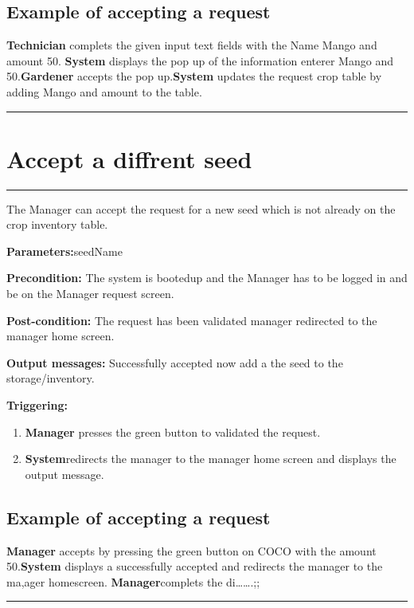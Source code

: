 \subsection{Example of accepting a request}
\textbf{Technician} complets the given input text fields with the Name Mango and
amount 50. \textbf{System} displays the pop up of the information enterer Mango
and 50.\textbf{Gardener} accepts the pop up.\textbf{System} updates the request
crop table by adding Mango and amount to the table.
\hfill
\vspace{0.5cm}
\hrule


\section{Accept a diffrent seed}

\hrule
\hfill
\vspace{0.5cm}

\label{operation:Accept a diffrent seed}

The Manager can accept the request for a new seed which is not already on the
crop inventory table.
\begin{description}
\item \textbf{Parameters:}seedName
\item \textbf{Precondition:} The system is bootedup and the Manager has to be
logged in and be on the Manager request screen.
\item \textbf{Post-condition:} The request has been validated manager
redirected to the manager home screen.
\item \item \textbf{Output messages:} Successfully accepted now add a the seed
to the storage/inventory.
\item \textbf{Triggering:}
\begin{enumerate}
\item \textbf{Manager} presses the green button to validated the request.
\item \textbf{System}redirects the manager to the manager home screen and
displays the output message.

\end{enumerate}
\end{description}

\subsection{Example of accepting a request}
\textbf{Manager} accepts by pressing the green button on COCO with the amount
50.\textbf{System} displays a successfully accepted and redirects the manager
to the ma,ager homescreen.
\textbf{Manager}complets the di\ldots\ldots.;;
\hfill
\vspace{0.5cm}
\hrule
 
